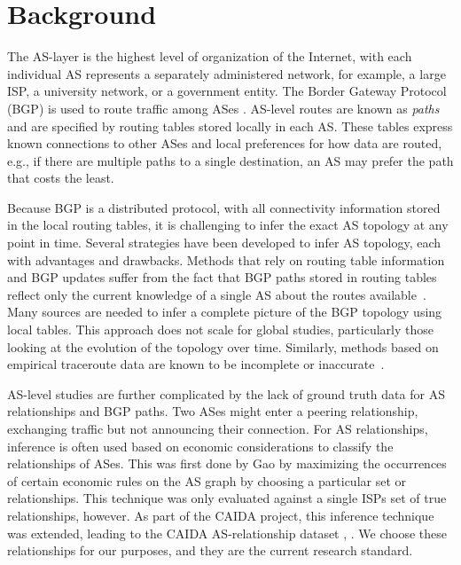 \section{Background}

The AS-layer is the highest level of organization of the Internet, with each
individual AS represents a separately administered network, for example, a
large ISP, a university network, or a government entity. The Border Gateway
Protocol (BGP) is used to route traffic among ASes \cite{bgp}.  AS-level routes
are known as \emph{paths} and are specified by routing tables stored locally in
each AS. These tables express known connections to other ASes and local
preferences for how data are routed, e.g., if there are multiple paths to a
single destination, an AS may prefer the path that costs the least.

Because BGP is a distributed protocol, with all connectivity
information stored in the local routing tables, it is challenging to
infer the exact AS topology at any point in time.  Several strategies have been 
developed to infer AS topology, each with advantages and drawbacks.  Methods that rely
on routing table information and BGP
updates suffer from the fact that BGP paths stored in routing tables
reflect only the current knowledge of a single AS about the routes
available~\cite{BGPStream}.
Many sources are needed to infer a complete picture of the BGP topology using local tables. 
This approach does not scale for
global studies, particularly those looking at the evolution of the
topology over time.
Similarly, methods based on empirical traceroute data are known to be 
incomplete or inaccurate~\cite{tracerouteProblems}.

\par AS-level studies are further complicated by the lack of ground
truth data for AS relationships and BGP paths. Two ASes might enter a peering relationship,
exchanging traffic but not announcing their connection. For AS relationships,
inference is often used based on economic considerations to classify
the relationships of ASes. This was first done by Gao \cite{gao} by
maximizing the occurrences of certain economic rules on the AS graph by
choosing a particular set or relationships. This technique was only
evaluated against a single ISPs set of true relationships, however. As
part of the CAIDA project, this inference technique was extended,
leading to the CAIDA AS-relationship dataset \cite{CAIDApaper},
\cite{CAIDA}. We choose these relationships for our purposes, and they
are the current research standard.

